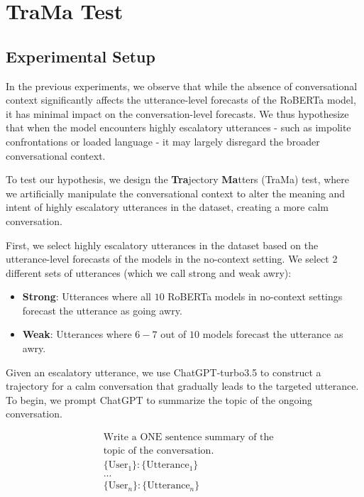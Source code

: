 \section{TraMa Test}

\subsection{Experimental Setup}
In the previous experiments, we observe that while the absence of conversational context significantly affects the utterance-level forecasts of the RoBERTa model, it has minimal impact on the conversation-level forecasts. 
We thus hypothesize that when the model encounters highly escalatory utterances - such as impolite confrontations or loaded language - it may largely disregard the broader conversational context.

To test our hypothesis, we design the \textbf{Tra}jectory \textbf{Ma}tters (TraMa) test, where we artificially manipulate the conversational context to alter the meaning and intent of highly escalatory utterances in the dataset, creating a more calm conversation.

First, we select highly escalatory utterances in the dataset based on the utterance-level forecasts of the models in the no-context setting. We select 2 different sets of utterances (which we call strong and weak awry):
\begin{itemize}
    \item \textbf{Strong}: Utterances where all $10$ RoBERTa models in no-context settings forecast the utterance as going awry.

    \item \textbf{Weak}: Utterances where $6-7$ out of $10$ models forecast the utterance as awry.
\end{itemize}

Given an escalatory utterance, we use ChatGPT-turbo3.5 to construct a trajectory for a calm conversation that gradually leads to the targeted utterance. To begin, we prompt ChatGPT to summarize the topic of the ongoing conversation.

{\ttfamily
\begin{align*}
& \text{Write a ONE sentence summary of the}\\
& \text{topic of the conversation.}\\
& \{\text{User}_1\} : \{\text{Utterance}_1\}\\
& ...\\
& \{\text{User}_n\} : \{\text{Utterance}_n\}\\
\end{align*}
}

